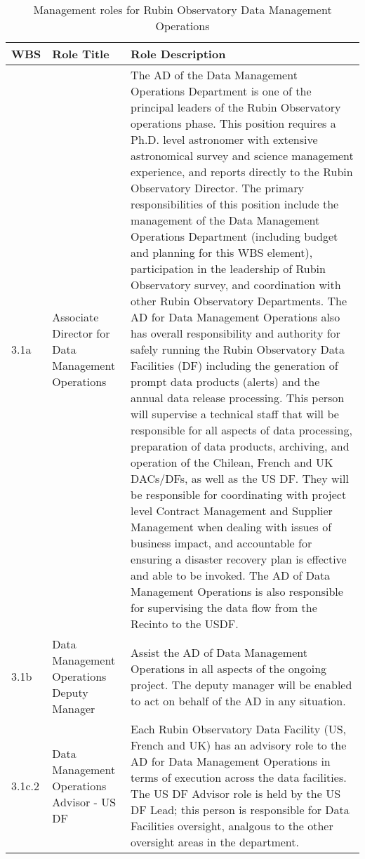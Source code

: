\normalsize \begin{longtable} {|p{}|p{}|p{}|} \caption{Management roles for Rubin Observatory Data Management Operations \label{tab:mroles}}\\ 
\hline 
\textbf{WBS}&\textbf{Role Title}&\textbf{Role Description} \\ \hline
{3.1a}&{Associate Director for Data Management Operations}&{The AD of the Data Management Operations Department is one of the principal leaders of the Rubin Observatory operations phase. This position requires a Ph.D. level astronomer with extensive astronomical survey and science management experience, and reports directly to the Rubin Observatory Director. The primary responsibilities of this position include the management of the Data Management Operations Department (including budget and planning for this WBS element), participation in the leadership of Rubin Observatory survey, and coordination with other Rubin Observatory Departments. The AD for Data Management Operations also has overall responsibility and authority for safely running the Rubin Observatory Data Facilities (DF) including the generation of prompt data products (alerts) and the annual data release processing. This person will supervise a technical staff that will be responsible for all aspects of data processing, preparation of data products, archiving, and operation of the Chilean, French and UK DACs/DFs, as well as the US DF. They will be responsible for coordinating with project level Contract Management and Supplier Management when dealing with issues of business impact, and accountable for ensuring a disaster recovery plan is effective and able to be invoked. The AD of Data Management Operations is also responsible for supervising the data flow from the Recinto to the USDF.} \\ \hline
{3.1b}&{Data Management Operations Deputy Manager}&{Assist the AD of Data Management Operations in all aspects of the ongoing project. The deputy manager will be enabled to act on behalf of the AD in any situation.} \\ \hline
{3.1c.2}&{Data Management Operations Advisor - US DF}&{Each Rubin Observatory Data Facility (US, French and UK) has an advisory role to the AD for Data Management Operations in terms of execution across the data facilities.  The US DF Advisor role is held by the US DF Lead; this person is responsible for Data Facilities oversight, analgous to the other oversight areas in the department. } \\ \hline

\end{longtable}
